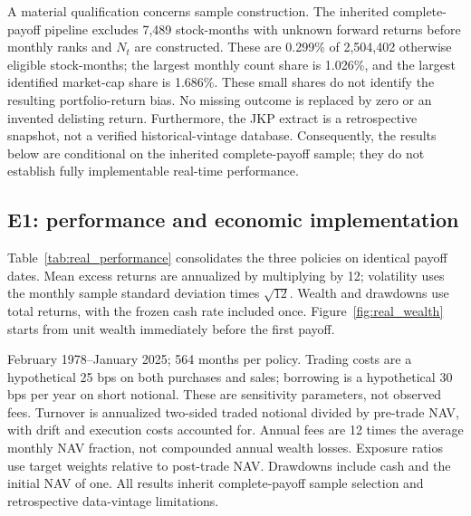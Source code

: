 A material qualification concerns sample construction. The inherited complete-payoff pipeline excludes 7,489 stock-months with unknown forward returns before monthly ranks and $N_t$ are constructed. These are 0.299\% of 2,504,402 otherwise eligible stock-months; the largest monthly count share is 1.026\%, and the largest identified market-cap share is 1.686\%. These small shares do not identify the resulting portfolio-return bias. No missing outcome is replaced by zero or an invented delisting return. Furthermore, the JKP extract is a retrospective snapshot, not a verified historical-vintage database. Consequently, the results below are conditional on the inherited complete-payoff sample; they do not establish fully implementable real-time performance.

\subsection{E1: performance and economic implementation}

Table~\ref{tab:real_performance} consolidates the three policies on identical payoff dates. Mean excess returns are annualized by multiplying by 12; volatility uses the monthly sample standard deviation times $\sqrt{12}$. Wealth and drawdowns use total returns, with the frozen cash rate included once. Figure~\ref{fig:real_wealth} starts from unit wealth immediately before the first payoff.

\begin{table}[p]
\centering
\caption{Common-sample performance and declared cost sensitivities}
\label{tab:real_performance}
\begingroup\scriptsize\setlength{\tabcolsep}{4pt}

\endgroup
\par\vspace{7pt}\begin{minipage}{\textwidth}\footnotesize
February 1978--January 2025; 564 months per policy. Trading costs are a hypothetical 25 bps on both purchases and sales; borrowing is a hypothetical 30 bps per year on short notional. These are sensitivity parameters, not observed fees. Turnover is annualized two-sided traded notional divided by pre-trade NAV, with drift and execution costs accounted for. Annual fees are 12 times the average monthly NAV fraction, not compounded annual wealth losses. Exposure ratios use target weights relative to post-trade NAV. Drawdowns include cash and the initial NAV of one. All results inherit complete-payoff sample selection and retrospective data-vintage limitations.
\end{minipage}
\end{table}

